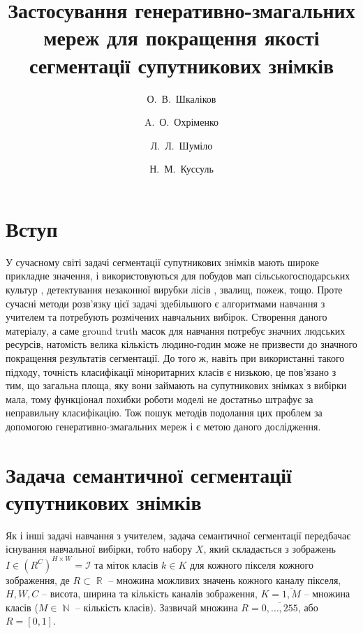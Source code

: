 \documentclass{ConfFTI}
\title{Застосування генеративно-змагальних мереж для покращення
якості сегментації супутникових знімків}
\author[\email]{О.~В.~Шкаліков}{1} %
\author{A.~О.~Охріменко}{1}
\author{Л.~Л.~Шуміло}{2}
\author{Н.~М.~Куссуль}{1, 3}
\affiliation{\ntuuipt}{1}
\affiliation{University of Maryland}{2}
\affiliation{Інститут космічних досліджень НАНУ ДКАУ}{3}
\DeclareMathOperator{\R}{\mathbb{R}}
\DeclareMathOperator{\N}{\mathbb{N}}
\begin{document}


\section*{Вступ}
У сучасному світі задачі сегментації супутникових знімків мають
широке прикладне значення, і використовуються для
побудов мап сільськогосподарських культур \cite{kussul2017deep}, детектування незаконної
вирубки лісів \cite{sat_logging}, звалищ, пожеж, тощо. Проте сучасні методи
розв'язку цієї задачі здебільшого є алгоритмами навчання з учителем
та потребують розмічених навчальних вибірок. Створення даного матеріалу,
а саме ground truth масок для навчання потребує значних людських ресурсів, натомість
велика кількість людино-годин може не призвести до значного покращення
результатів сегментації. До того ж, навіть при використанні
такого підходу, точність класифікації міноритарних класів
є низькою, це пов'язано з тим, що загальна площа, яку вони займають
на супутникових знімках з вибірки мала, тому функціонал похибки
роботи моделі не достатньо штрафує за неправильну класифікацію.
Тож пошук методів подолання цих проблем за допомогою генеративно-змагальних
мереж і є метою даного дослідження.

\section{Задача семантичної сегментації супутникових знімків}

Як і інші задачі навчання з учителем, задача семантичної сегментації
передбачає існування навчальної вибірки, тобто набору $X$,
який складається з зображень
$I \in \left( R^C \right)^{H \times W} = \mathcal{I}$ та міток класів
$k \in K$ для кожного пікселя кожного зображення, де $R \subset \R$ --
множина можливих значень кожного каналу пікселя,
$H, W, C$ -- висота, ширина та кількість каналів зображення,
$K = \overline{1, M}$ -- множина класів ($M \in \N$ -- кількість класів).
Зазвичай множина $R = \overline{0, \dots, 255}$, або $R = [0, 1]$.
\end{document}
